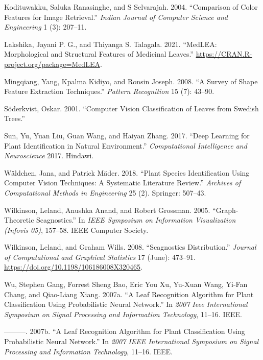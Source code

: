 \documentclass{article}
\begin{document}
\leavevmode\hypertarget{ref-colarticle1}{}%
Kodituwakku, Saluka Ranasinghe, and S Selvarajah. 2004. ``Comparison of
Color Features for Image Retrieval.'' \emph{Indian Journal of Computer
Science and Engineering} 1 (3): 207--11.

\leavevmode\hypertarget{ref-medlea}{}%
Lakshika, Jayani P. G., and Thiyanga S. Talagala. 2021. ``MedLEA:
Morphological and Structural Features of Medicinal Leaves.''
\url{https://CRAN.R-project.org/package=MedLEA}.

\leavevmode\hypertarget{ref-article7}{}%
Mingqiang, Yang, Kpalma Kidiyo, and Ronsin Joseph. 2008. ``A Survey of
Shape Feature Extraction Techniques.'' \emph{Pattern Recognition} 15
(7): 43--90.

\leavevmode\hypertarget{ref-soderkvist2001computer}{}%
Söderkvist, Oskar. 2001. ``Computer Vision Classification of Leaves from
Swedish Trees.''

\leavevmode\hypertarget{ref-sun2017deep}{}%
Sun, Yu, Yuan Liu, Guan Wang, and Haiyan Zhang. 2017. ``Deep Learning
for Plant Identification in Natural Environment.'' \emph{Computational
Intelligence and Neuroscience} 2017. Hindawi.

\leavevmode\hypertarget{ref-articlee}{}%
Wäldchen, Jana, and Patrick Mäder. 2018. ``Plant Species Identification
Using Computer Vision Techniques: A Systematic Literature Review.''
\emph{Archives of Computational Methods in Engineering} 25 (2).
Springer: 507--43.

\leavevmode\hypertarget{ref-inproceedings44}{}%
Wilkinson, Leland, Anushka Anand, and Robert Grossman. 2005.
``Graph-Theoretic Scagnostics.'' In \emph{IEEE Symposium on Information
Visualization (Infovis 05)}, 157--58. IEEE Computer Society.

\leavevmode\hypertarget{ref-article37}{}%
Wilkinson, Leland, and Graham Wills. 2008. ``Scagnostics Distribution.''
\emph{Journal of Computational and Graphical Statistics} 17 (June):
473--91. \url{https://doi.org/10.1198/106186008X320465}.

\leavevmode\hypertarget{ref-4458016}{}%
Wu, Stephen Gang, Forrest Sheng Bao, Eric You Xu, Yu-Xuan Wang, Yi-Fan
Chang, and Qiao-Liang Xiang. 2007a. ``A Leaf Recognition Algorithm for
Plant Classification Using Probabilistic Neural Network.'' In \emph{2007
Ieee International Symposium on Signal Processing and Information
Technology}, 11--16. IEEE.

\leavevmode\hypertarget{ref-wu2007leaf}{}%
---------. 2007b. ``A Leaf Recognition Algorithm for Plant
Classification Using Probabilistic Neural Network.'' In \emph{2007 IEEE
International Symposium on Signal Processing and Information
Technology}, 11--16. IEEE.



\end{document}
